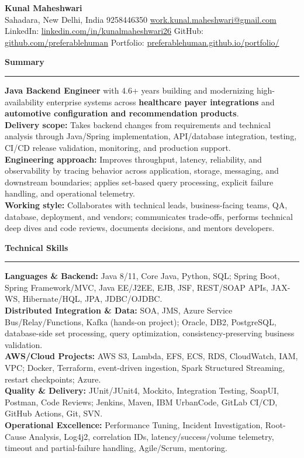 \documentclass[11pt,letterpaper]{article}
\newcommand{\ressection}[1]{\Needspace{5\baselineskip}\vspace{8pt}\par\textbf{#1}\par\vspace{2pt}\hrule\vspace{5pt}}
\begin{document}
\pagestyle{empty}\raggedright\fontsize{11}{12.5}\selectfont

{\Large \textbf{Kunal Maheshwari}}\\
Sahadara, New Delhi, India \textbar{} 9258446350 \textbar{} \href{mailto:work.kunal.maheshwari@gmail.com}{work.kunal.maheshwari@gmail.com}\\
LinkedIn: \href{https://www.linkedin.com/in/kunalmaheshwari26}{linkedin.com/in/kunalmaheshwari26} \textbar{} GitHub: \href{https://github.com/preferablehuman}{github.com/preferablehuman} \textbar{} Portfolio: \href{https://preferablehuman.github.io/portfolio/}{preferablehuman.github.io/portfolio/}

\ressection{Summary}
\textbf{Java Backend Engineer} with 4.6+ years building and modernizing high-availability enterprise systems across \textbf{healthcare payer integrations} and \textbf{automotive configuration and recommendation products}.\\[2pt]
\textbf{Delivery scope:} Takes backend changes from requirements and technical analysis through Java/Spring implementation, API/database integration, testing, CI/CD release validation, monitoring, and production support.\\[2pt]
\textbf{Engineering approach:} Improves throughput, latency, reliability, and observability by tracing behavior across application, storage, messaging, and downstream boundaries; applies set-based query processing, explicit failure handling, and operational telemetry.\\[2pt]
\textbf{Working style:} Collaborates with technical leads, business-facing teams, QA, database, deployment, and vendors; communicates trade-offs, performs technical deep dives and code reviews, documents decisions, and mentors developers.

\ressection{Technical Skills}
\textbf{Languages \& Backend:} Java 8/11, Core Java, Python, SQL; Spring Boot, Spring Framework/MVC, Java EE/J2EE, EJB, JSF, REST/SOAP APIs, JAX-WS, Hibernate/HQL, JPA, JDBC/OJDBC.\\
\textbf{Distributed Integration \& Data:} SOA, JMS, Azure Service Bus/Relay/Functions, Kafka (hands-on project); Oracle, DB2, PostgreSQL, database-side set processing, query optimization, consistency-preserving business validation.\\
\textbf{AWS/Cloud Projects:} AWS S3, Lambda, EFS, ECS, RDS, CloudWatch, IAM, VPC; Docker, Terraform, event-driven ingestion, Spark Structured Streaming, restart checkpoints; Azure.\\
\textbf{Quality \& Delivery:} JUnit/JUnit4, Mockito, Integration Testing, SoapUI, Postman, Code Reviews; Jenkins, Maven, IBM UrbanCode, GitLab CI/CD, GitHub Actions, Git, SVN.\\
\textbf{Operational Excellence:} Performance Tuning, Incident Investigation, Root-Cause Analysis, Log4j2, correlation IDs, latency/success/volume telemetry, timeout and partial-failure handling, Agile/Scrum, mentoring.
\end{document}
